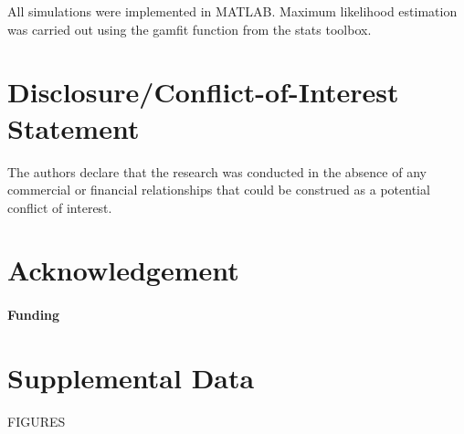 \documentclass{frontiersSCNS} %
\begin{document}
All simulations were implemented in MATLAB. Maximum likelihood estimation was carried out using the gamfit function from the stats toolbox. 



\section*{Disclosure/Conflict-of-Interest Statement}
The authors declare that the research was conducted in the absence of any commercial or financial relationships that could be construed as a potential conflict of interest.

\section*{Acknowledgement}

\paragraph{Funding\textcolon} 

\section*{Supplemental Data}
FIGURES


\end{document}
